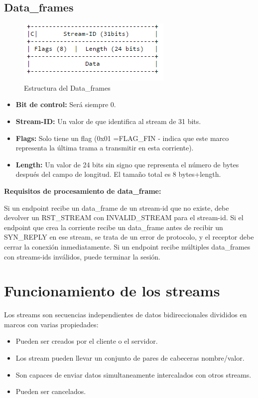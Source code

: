 \subsection{Data\_frames}
\begin{figure}[H] %
\includegraphics[scale=1]{dataframes.png}  %
\centering
\caption{Estructura del Data\_frames} \label{fig:figura2}
\end{figure}
\begin{itemize}
\item \textbf{Bit de control:} Será siempre 0.
\item \textbf{Stream-ID:} Un valor de que identifica al stream de 31 bits.
\item \textbf{Flags:} Solo tiene un flag (0x01 =FLAG\_FIN - indica que este marco representa la última trama a transmitir en esta corriente).
\item \textbf{Length:} Un valor de 24 bits sin signo que representa el número de bytes después del campo de longitud. El tamaño total es 8 bytes+length.
\end{itemize}

\textbf{Requisitos de procesamiento de data\_frame:}

Si un endpoint recibe un data\_frame de un stream-id que no existe, debe devolver un RST\_STREAM con INVALID\_STREAM para el stream-id.
Si el endpoint que crea la corriente recibe un data\_frame antes de recibir un SYN\_REPLY en ese stream, se trata de un error de protocolo, y el receptor debe cerrar la conexión inmediatamente.
Si un endpoint recibe múltiples data\_frames con streams-ids inválidos, puede terminar la sesión.

\section{Funcionamiento de los streams}
Los streams son secuencias independientes de datos bidireccionales divididos en marcos con varias propiedades:
\begin{itemize}
\item Pueden ser creados por el cliente o el servidor.
\item Los stream pueden llevar un conjunto de pares de cabeceras nombre/valor.
\item Son capaces de enviar datos simultaneamente intercalados con otros streams.
\item Pueden ser cancelados.
\end{itemize}
